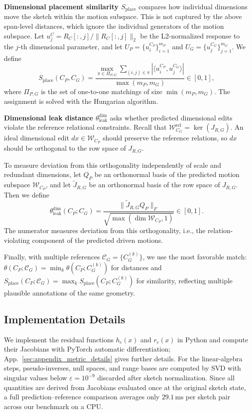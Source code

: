 \noindent\textbf{Dimensional placement similarity $S_\mathrm{place}$}
compares how individual dimensions move the sketch within the motion subspace. This is not captured by the above span-level distances, which ignore the individual generators of the motion subspace. Let $u_j^C={R_C[:,j]}/{\lVert R_C[:,j]\rVert_2}$ be the L2-normalized response to the $j$-th dimensional parameter, and let
$U_P=\{u_i^{C_P}\}_{i=1}^{m_P}$ and
$U_G=\{u_j^{C_G}\}_{j=1}^{m_G}$. We define
\begin{equation}
    S_{\mathrm{place}}(C_P,C_G)
    =
    \frac{
    \max_{\pi\in\Pi_{P,G}}
    \sum_{(i,j)\in\pi}
    \left|\langle u_i^{C_P},u_j^{C_G}\rangle\right|
    }{\max(m_P,m_G)}\in[0,1],
    \label{eq:asgn_sim}
\end{equation}
where $\Pi_{P,G}$ is the set of one-to-one matchings of size $\min(m_P,m_G)$. The assignment is solved with the Hungarian algorithm.

\noindent\textbf{Dimensional leak distance $\theta_\mathrm{leak}^\mathrm{dim}$}
asks whether predicted dimensional edits violate the reference relational constraints. Recall that $\mathcal{W}_{C_G}^{\mathrm{rel}}=\ker(J_{R,G})$. An ideal dimensional edit $dx\in\mathcal{W}_{C_P}$ should preserve the reference relations, so $dx$ should be orthogonal to the row space of $J_{R,G}$.

To measure deviation from this orthogonality independently of scale and redundant dimensions, let $Q_P$ be an orthonormal basis of the predicted motion subspace $\mathcal{W}_{C_P}$, and let $\widetilde{J}_{R,G}$ be an orthonormal basis of the row space of $J_{R,G}$. Then we define
\begin{equation}
    \theta_{\mathrm{leak}}^{\mathrm{dim}}(C_P;C_G)
    =
    \frac{\lVert \widetilde{J}_{R,G}Q_P\rVert_F}
    {\sqrt{\max(\dim\mathcal{W}_{C_P},1)}}\in[0,1].
    \label{eq:rel_leak_distance}
\end{equation}
The numerator measures deviation from this orthogonality, i.e., the relation-violating component of the predicted driven motions.

Finally, with multiple references $\mathcal{C}_G=\{C_G^{(k)}\}$, we use the most favorable match:
$\theta(C_P;\mathcal{C}_G)=\min_k\theta(C_P;C_G^{(k)})$ for distances and $S_{\mathrm{place}}(C_P;\mathcal{C}_G)=\max_k S_{\mathrm{place}}(C_P;C_G^{(k)})$ for similarity, reflecting multiple plausible annotations of the same geometry.


\subsection{Implementation Details}
\label{sec:metric_implementation}

We implement the residual functions $h_c(x)$ and $r_c(x)$ in Python and compute their Jacobians with PyTorch automatic differentiation; App.~\ref{sec:appendix_metric_details} gives further details. For the linear-algebra steps, pseudo-inverses, null spaces, and range bases are computed by SVD with singular values below $\varepsilon=10^{-9}$ discarded after sketch normalization. Since all quantities are derived from Jacobians evaluated once at the original sketch state, a full prediction--reference comparison averages only $29.1\,\mathrm{ms}$ per sketch pair across our benchmark on a CPU.

